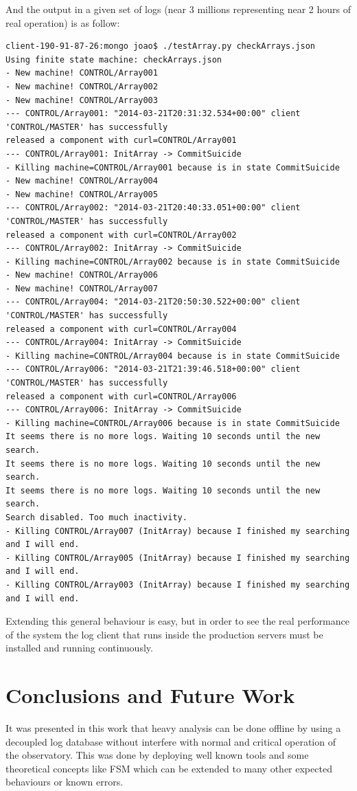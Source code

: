 \documentclass[]{spie}  %
\begin{document}
And the output in a given set of logs (near 3 millions representing near 2 hours of real operation) is as follow:
{\small 
\begin{verbatim}
client-190-91-87-26:mongo joao$ ./testArray.py checkArrays.json
Using finite state machine: checkArrays.json
- New machine! CONTROL/Array001
- New machine! CONTROL/Array002
- New machine! CONTROL/Array003
--- CONTROL/Array001: "2014-03-21T20:31:32.534+00:00" client 'CONTROL/MASTER' has successfully 
released a component with curl=CONTROL/Array001
--- CONTROL/Array001: InitArray -> CommitSuicide
- Killing machine=CONTROL/Array001 because is in state CommitSuicide
- New machine! CONTROL/Array004
- New machine! CONTROL/Array005
--- CONTROL/Array002: "2014-03-21T20:40:33.051+00:00" client 'CONTROL/MASTER' has successfully 
released a component with curl=CONTROL/Array002
--- CONTROL/Array002: InitArray -> CommitSuicide
- Killing machine=CONTROL/Array002 because is in state CommitSuicide
- New machine! CONTROL/Array006
- New machine! CONTROL/Array007
--- CONTROL/Array004: "2014-03-21T20:50:30.522+00:00" client 'CONTROL/MASTER' has successfully 
released a component with curl=CONTROL/Array004
--- CONTROL/Array004: InitArray -> CommitSuicide
- Killing machine=CONTROL/Array004 because is in state CommitSuicide
--- CONTROL/Array006: "2014-03-21T21:39:46.518+00:00" client 'CONTROL/MASTER' has successfully 
released a component with curl=CONTROL/Array006
--- CONTROL/Array006: InitArray -> CommitSuicide
- Killing machine=CONTROL/Array006 because is in state CommitSuicide
It seems there is no more logs. Waiting 10 seconds until the new search.
It seems there is no more logs. Waiting 10 seconds until the new search.
It seems there is no more logs. Waiting 10 seconds until the new search.
Search disabled. Too much inactivity.
- Killing CONTROL/Array007 (InitArray) because I finished my searching and I will end.
- Killing CONTROL/Array005 (InitArray) because I finished my searching and I will end.
- Killing CONTROL/Array003 (InitArray) because I finished my searching and I will end.
\end{verbatim}
}

Extending this general behaviour is easy, but in order to see the real
performance of the system the log client that runs inside the production
servers must be installed and running continuously.

\section{Conclusions and Future Work}
It was presented in this work that heavy analysis can be done offline by using a
decoupled log database without interfere with normal and critical operation of the
observatory. This was done by deploying well known tools and some theoretical
concepts like FSM which can be extended to many other expected
behaviours or known errors. 
\end{document}
